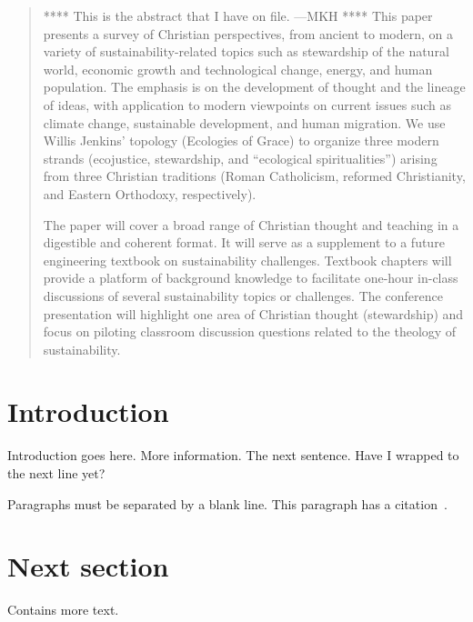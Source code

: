 \documentclass[12pt]{article}
\begin{document}
	
\maketitle

\begin{abstract}
**** This is the abstract that I have on file. ---MKH ****
This paper presents a survey of Christian perspectives, 
from ancient to modern, 
on a variety of sustainability-related topics such as stewardship of the natural world, 
economic growth and technological change, energy, and human population. 
The emphasis is on the development of thought and the lineage of ideas, 
with application to modern viewpoints on current issues 
such as climate change, sustainable development, and human migration. 
We use Willis Jenkins’ topology (Ecologies of Grace) 
to organize three modern strands 
(ecojustice, stewardship, and “ecological spiritualities”) 
arising from three Christian traditions 
(Roman Catholicism, reformed Christianity, and Eastern Orthodoxy, respectively).

The paper will cover a broad range of Christian thought and teaching 
in a digestible and coherent format. 
It will serve as a supplement to a future engineering textbook on sustainability challenges. 
Textbook chapters will provide a platform 
of background knowledge to facilitate one-hour in-class discussions
of several sustainability topics or challenges. 
The conference presentation will highlight 
one area of Christian thought (stewardship) 
and focus on piloting classroom discussion questions related to the theology of sustainability.
\end{abstract}

\section{Introduction}
\label{sec:introduction}

Introduction goes here. 
More information. 
The next sentence. 
Have I wrapped to the next line yet?

Paragraphs must be separated by a blank line.
This paragraph has a citation~\autocite{bogus}.


\section{Next section}
\label{sec:next_sect}

Contains more text.

\printbibliography
\end{document}

